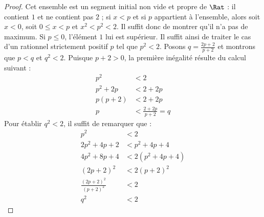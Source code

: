 \documentclass[../../../include/open-logic-section]{subfiles}
\begin{document}
\begin{proof}
Cet ensemble est un segment initial non vide et propre de $\Rat$ :
il contient $1$ et ne contient pas $2$ ; si $x<p$ et si $p$ appartient
à l'ensemble, alors soit $x<0$, soit $0\leq x<p$ et $x^2<p^2<2$.
Il suffit donc de montrer qu'il n'a pas de maximum. Si $p\leq0$,
l'élément $1$ lui est supérieur. Il suffit ainsi de traiter le cas
d'un rationnel strictement positif $p$ tel que $p^2<2$.
Posons $q=\frac{2p+2}{p+2}$ et montrons que $p<q$ et $q^2<2$.
Puisque $p+2>0$, la première inégalité résulte du calcul suivant :
\begin{align*}
  p^2 &< 2\\
  p^2 + 2p &< 2 + 2p\\
  p(p + 2) &< 2 + 2p\\
  p &< \tfrac{2+2p}{p+2} = q
\end{align*}
Pour établir $q^2<2$, il suffit de remarquer que :
\begin{align*}
  p^2 &< 2\\
  2p^2 + 4p + 2 &< p^2 + 4p+ 4\\
  4p^2 + 8p + 4 &< 2(p^2 + 4p + 4)\\
  (2p+2)^2 &< 2(p+2)^2\\
  \tfrac{(2p+2)^2}{(p+2)^2} &< 2\\
  q^2 &< 2
\end{align*}
\end{proof}
\end{document}
